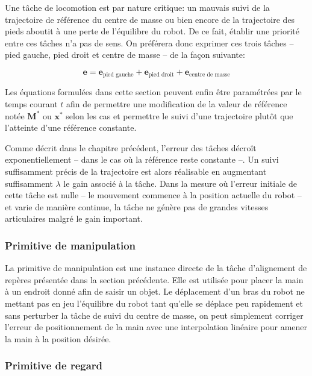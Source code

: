 Une tâche de locomotion est par nature critique: un mauvais suivi de
la trajectoire de référence du centre de masse ou bien encore de la
trajectoire des pieds aboutit à une perte de l'équilibre du robot. De
ce fait, établir une priorité entre ces tâches n'a pas de sens. On
préférera donc exprimer ces trois tâches -- pied gauche, pied droit et
centre de masse -- de la façon suivante:

\begin{equation}
  \mathbf{e} = \mathbf{e}_{\text{pied gauche}} + \mathbf{e}_{\text{pied droit}} + \mathbf{e}_{\text{centre de masse}}
\end{equation}

Les équations formulées dans cette section peuvent enfin être
paramétrées par le temps courant $t$ afin de permettre une
modification de la valeur de référence notée $\mathbf{M}^*$ ou
$\mathbf{x}^*$ selon les cas et permettre le suivi d'une trajectoire
plutôt que l'atteinte d'une référence constante.


Comme décrit dans le chapitre précédent, l'erreur des tâches décroît
exponentiellement -- dans le cas où la référence reste constante
--. Un suivi suffisamment précis de la trajectoire est alors
réalisable en augmentant suffisamment $\lambda$ le gain associé à la
tâche. Dans la mesure où l'erreur initiale de cette tâche est nulle --
le mouvement commence à la position actuelle du robot -- et varie de
manière continue, la tâche ne génère pas de grandes vitesses
articulaires malgré le gain important.


\subsubsection{Primitive de manipulation}


La primitive de manipulation est une instance directe de la tâche
d'alignement de repères présentée dans la section précédente. Elle
est utilisée pour placer la main à un endroit donné afin de saisir un
objet. Le déplacement d'un bras du robot ne mettant pas en jeu
l'équilibre du robot tant qu'elle se déplace peu rapidement et sans
perturber la tâche de suivi du centre de masse, on peut simplement
corriger l'erreur de positionnement de la main avec une interpolation
linéaire pour amener la main à la position désirée.


\subsubsection{Primitive de regard}



